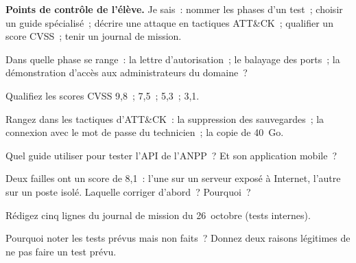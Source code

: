 \begin{boxinfo}
\textbf{Points de contrôle de l'élève.} Je sais~: nommer les phases d'un
test~; choisir un guide spécialisé~; décrire une attaque en tactiques
ATT\&CK~; qualifier un score CVSS~; tenir un journal de mission.
\end{boxinfo}

\bigskip

\begin{boxexo}[title={\ding{45}\quad Exercice~4.1. Les phases \niveaubase}]
Dans quelle phase se range~: la lettre d'autorisation~; le balayage des
ports~; la démonstration d'accès aux administrateurs du domaine~?
\end{boxexo}

\begin{boxexo}[title={\ding{45}\quad Exercice~4.2. Qualifier \niveaubase}]
Qualifiez les scores CVSS 9,8~; 7,5~; 5,3~; 3,1.
\end{boxexo}

\begin{boxexo}[title={\ding{45}\quad Exercice~4.3. Tactiques \niveaubase}]
Rangez dans les tactiques d'ATT\&CK~: la suppression des sauvegardes~; la
connexion avec le mot de passe du technicien~; la copie de 40~Go.
\end{boxexo}

\begin{boxexo}[title={\ding{45}\quad Exercice~4.4. Le guide \niveaumoyen}]
Quel guide utiliser pour tester l'API de l'ANPP~? Et son application mobile~?
\end{boxexo}

\begin{boxexo}[title={\ding{45}\quad Exercice~4.5. Le contexte \niveaumoyen}]
Deux failles ont un score de 8,1~: l'une sur un serveur exposé à Internet,
l'autre sur un poste isolé. Laquelle corriger d'abord~? Pourquoi~?
\end{boxexo}

\begin{boxexo}[title={\ding{45}\quad Exercice~4.6. Le journal \niveaumoyen}]
Rédigez cinq lignes du journal de mission du 26~octobre (tests internes).
\end{boxexo}

\begin{boxexo}[title={\ding{45}\quad Exercice~4.7. Non fait \niveaumoyen}]
Pourquoi noter les tests prévus mais non faits~? Donnez deux raisons
légitimes de ne pas faire un test prévu.
\end{boxexo}

